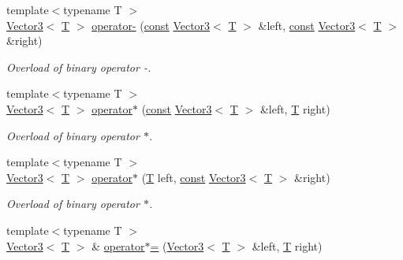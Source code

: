 \begin{DoxyCompactItemize}
{\footnotesize template$<$typename T $>$ }\\\hyperlink{classsf_1_1_vector3}{Vector3}$<$ \hyperlink{curses_8priv_8h_a5ef253115820acf7d27f3c5c3b02a0f0}{T} $>$ \hyperlink{classsf_1_1_vector3_abe0b9411c00cf807bf8a5f835874bd2a}{operator-\/} (\hyperlink{term__entry_8h_a57bd63ce7f9a353488880e3de6692d5a}{const} \hyperlink{classsf_1_1_vector3}{Vector3}$<$ \hyperlink{curses_8priv_8h_a5ef253115820acf7d27f3c5c3b02a0f0}{T} $>$ \&left, \hyperlink{term__entry_8h_a57bd63ce7f9a353488880e3de6692d5a}{const} \hyperlink{classsf_1_1_vector3}{Vector3}$<$ \hyperlink{curses_8priv_8h_a5ef253115820acf7d27f3c5c3b02a0f0}{T} $>$ \&right)
\begin{DoxyCompactList}\small\item\em Overload of binary operator -\/. \end{DoxyCompactList}\item 
{\footnotesize template$<$typename T $>$ }\\\hyperlink{classsf_1_1_vector3}{Vector3}$<$ \hyperlink{curses_8priv_8h_a5ef253115820acf7d27f3c5c3b02a0f0}{T} $>$ \hyperlink{classsf_1_1_vector3_a44ec312b31c1a85dcff4863795f98329}{operator$\ast$} (\hyperlink{term__entry_8h_a57bd63ce7f9a353488880e3de6692d5a}{const} \hyperlink{classsf_1_1_vector3}{Vector3}$<$ \hyperlink{curses_8priv_8h_a5ef253115820acf7d27f3c5c3b02a0f0}{T} $>$ \&left, \hyperlink{curses_8priv_8h_a5ef253115820acf7d27f3c5c3b02a0f0}{T} right)
\begin{DoxyCompactList}\small\item\em Overload of binary operator $\ast$. \end{DoxyCompactList}\item 
{\footnotesize template$<$typename T $>$ }\\\hyperlink{classsf_1_1_vector3}{Vector3}$<$ \hyperlink{curses_8priv_8h_a5ef253115820acf7d27f3c5c3b02a0f0}{T} $>$ \hyperlink{classsf_1_1_vector3_aa6f2b0d9f79c1b9774759b7087affbb1}{operator$\ast$} (\hyperlink{curses_8priv_8h_a5ef253115820acf7d27f3c5c3b02a0f0}{T} left, \hyperlink{term__entry_8h_a57bd63ce7f9a353488880e3de6692d5a}{const} \hyperlink{classsf_1_1_vector3}{Vector3}$<$ \hyperlink{curses_8priv_8h_a5ef253115820acf7d27f3c5c3b02a0f0}{T} $>$ \&right)
\begin{DoxyCompactList}\small\item\em Overload of binary operator $\ast$. \end{DoxyCompactList}\item 
{\footnotesize template$<$typename T $>$ }\\\hyperlink{classsf_1_1_vector3}{Vector3}$<$ \hyperlink{curses_8priv_8h_a5ef253115820acf7d27f3c5c3b02a0f0}{T} $>$ \& \hyperlink{classsf_1_1_vector3_ad5fb972775ce8ab58cd9670789e806a7}{operator$\ast$=} (\hyperlink{classsf_1_1_vector3}{Vector3}$<$ \hyperlink{curses_8priv_8h_a5ef253115820acf7d27f3c5c3b02a0f0}{T} $>$ \&left, \hyperlink{curses_8priv_8h_a5ef253115820acf7d27f3c5c3b02a0f0}{T} right)

\end{DoxyCompactItemize}
